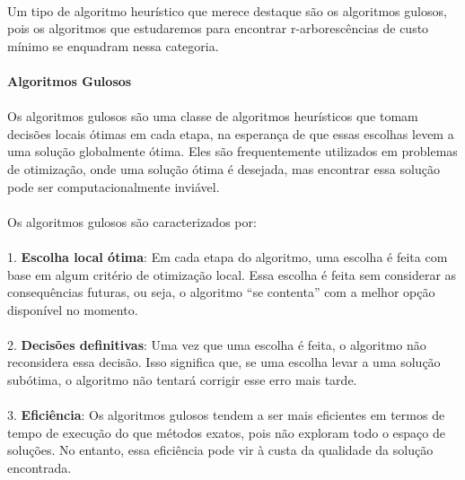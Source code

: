 \documentclass[12pt,a4paper]{article}
\def\emph#1{#1}%
\begin{document}
\paragraph{}
Um tipo de algoritmo heurístico que merece destaque são os \emph{algoritmos gulosos}, pois os algoritmos que estudaremos para encontrar r-arborescências de custo mínimo se enquadram nessa categoria.

\paragraph{Algoritmos Gulosos}
\paragraph{}
Os algoritmos gulosos são uma classe de algoritmos heurísticos que tomam decisões locais ótimas em cada etapa, na esperança de que essas escolhas levem a uma solução globalmente ótima. Eles são frequentemente utilizados em problemas de otimização, onde uma solução ótima é desejada, mas encontrar essa solução pode ser computacionalmente inviável.

\paragraph{}
Os algoritmos gulosos são caracterizados por:
\paragraph{}

1. \textbf{Escolha local ótima}: Em cada etapa do algoritmo, uma escolha é feita com base em algum critério de otimização local. Essa escolha é feita sem considerar as consequências futuras, ou seja, o algoritmo ``se contenta'' com a melhor opção disponível no momento.

\paragraph{}
2. \textbf{Decisões definitivas}: Uma vez que uma escolha é feita, o algoritmo não reconsidera essa decisão. Isso significa que, se uma escolha levar a uma solução subótima, o algoritmo não tentará corrigir esse erro mais tarde.

\paragraph{}
3. \textbf{Eficiência}: Os algoritmos gulosos tendem a ser mais eficientes em termos de tempo de execução do que métodos exatos, pois não exploram todo o espaço de soluções. No entanto, essa eficiência pode vir à custa da qualidade da solução encontrada.
\end{document}
